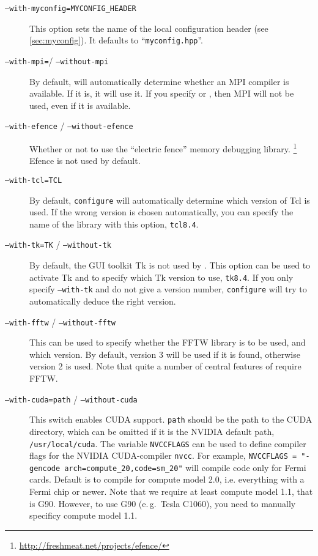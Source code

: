 \begin{description}
\item[\texttt{--with-myconfig=MYCONFIG\_HEADER}] This option sets the
  name of the local configuration header (see \vref{sec:myconfig}). It
  defaults to ``\texttt{myconfig.hpp}''.
\item[\texttt{--with-mpi=}/ \texttt{--without-mpi}] By default,
   will automatically determine whether an MPI
  compiler is available.  If it is, it will use it.  If you specify
   or , then MPI will
  not be used, even if it is available.
\item[\texttt{--with-efence} / \texttt{--without-efence}] Whether or
  not to use the ``electric fence'' memory debugging library.
  \footnote{\url{http://freshmeat.net/projects/efence/}} Efence is not
  used by default.
\item[\texttt{--with-tcl=TCL}] By default, \texttt{configure} will
  automatically determine which version of Tcl is used.  If the wrong
  version is chosen automatically, you can specify the name of the
  library with this option, \eg \texttt{tcl8.4}.
\item[\texttt{--with-tk=TK} / \texttt{--without-tk}] By default, the
  GUI toolkit Tk is not used by \es. This option can be used to
  activate Tk and to specify which Tk version to use, \eg{}
  \texttt{tk8.4}. If you only specify \texttt{--with-tk} and do not
  give a version number, \texttt{configure} will try to automatically
  deduce the right version.
\item[\texttt{--with-fftw} / \texttt{--without-fftw}] This can
  be used to specify whether the FFTW library is to be used, and which
  version.  By default, version 3 will be used if it is found,
  otherwise version 2 is used.  Note that quite a number of central
  features of \es require FFTW.
\item[\texttt{--with-cuda=path} / \texttt{--without-cuda}] This switch
  enables CUDA support. \texttt{path} should be the path to the CUDA
  directory, which can be omitted if it is the NVIDIA default path,
  \ie \texttt{/usr/local/cuda}. The variable \texttt{NVCCFLAGS} can
  be used to define compiler flags for the NVIDIA CUDA-compiler
  \texttt{nvcc}. For example, \texttt{NVCCFLAGS = "{}-gencode
    arch=compute_20,code=sm_20"{}} will compile code only for Fermi
  cards.  Default is to compile for compute model 2.0,
  i.e. everything with a Fermi chip or newer.  Note that we require at
  least compute model 1.1, that is G90. However, to use G90 (e.\,g.~Tesla
  C1060), you need to manually specificy compute model 1.1.
\end{description}

